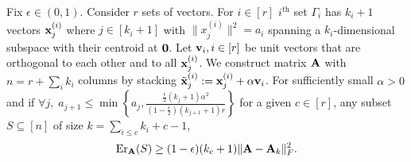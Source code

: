 \documentclass{article}
\begin{document}
\begin{lemma}\label{l:lowerbounddouble2}
	Fix $\epsilon\in(0,1)$.  Consider $r$ sets of vectors. For $i\in [r]$ $i^\text{th}$ set $\Gamma_i$ has $k_i+1$ vectors $\mathbf x^{(i)}_j$ where $j\in[k_i+1]$
	with $\|x_j^{(i)}\|^2=a_i$ spanning a 
	$k_i$-dimensional subspace with their centroid at $\mathbf 0$. 
	Let $\mathbf v_i, i \in [r]$ 
	be unit vectors that are orthogonal to each other and to all $\mathbf x^{(i)}_j$. We construct
	matrix $\mathbf A$ with $n= r + \sum_i k_i$ columns by stacking
	$\tilde{\mathbf x}^{(i)}_j:=\mathbf x^{(i)}_j + \alpha \mathbf v_i$. For sufficiently small
	$\alpha>0$ and if $\forall j,\; a_{j+1} \leq \min\left\{ a_j, \frac{\frac{\epsilon}{2} (k_j+1) \alpha^2 }{(1-\frac{\epsilon}{2}) (k_{j+1}+1)r} \right\}$ for a given $c \in [r]$, any subset $S\subseteq[n]$ of size $k = \sum_{i\leq c}k_i +c-1$,
	\begin{align*}
	\mathrm{Er}_{\mathbf A}(S)\geq (1-\epsilon)(k_c+1) \| \mathbf A -\mathbf A_{k}\|^2_F.
	\end{align*}
\end{lemma}
\end{document}
